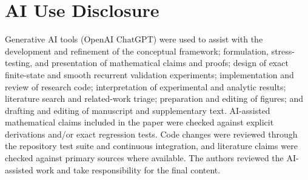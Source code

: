 \section*{AI Use Disclosure}

Generative AI tools (OpenAI ChatGPT) were used to assist with the development and refinement of the conceptual framework; formulation, stress-testing, and presentation of mathematical claims and proofs; design of exact finite-state and smooth recurrent validation experiments; implementation and review of research code; interpretation of experimental and analytic results; literature search and related-work triage; preparation and editing of figures; and drafting and editing of manuscript and supplementary text. AI-assisted mathematical claims included in the paper were checked against explicit derivations and/or exact regression tests. Code changes were reviewed through the repository test suite and continuous integration, and literature claims were checked against primary sources where available. The authors reviewed the AI-assisted work and take responsibility for the final content.
